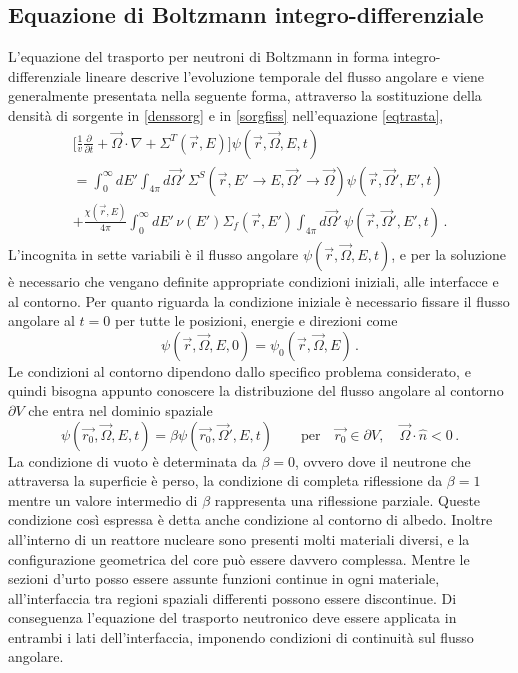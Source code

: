 \subsection{Equazione di Boltzmann integro-differenziale}
L'equazione del trasporto per neutroni di Boltzmann in forma 
integro-differenziale lineare descrive l'evoluzione temporale del flusso 
angolare e viene generalmente presentata nella seguente forma, attraverso la 
sostituzione della densità di sorgente in \eqref{denssorg} e in \eqref{sorgfiss} 
nell'equazione \eqref{eqtrasta},
\begin{multline}
\biggl[ \frac{1}{v} \frac{\partial}{\partial{t}} + \vec{\Omega} \cdot \nabla + 
\Sigma^T(\vec{r},E)
\biggr] \psi(\vec{r},\vec{\Omega},E,t) \\
= \int_{0}^{\infty} dE' \int_{4\pi} 
d\vec{\Omega}'\,\Sigma^S(\vec{r},{E'\rightarrow E},
{\vec{\Omega}'\rightarrow\vec{\Omega}}) 
\psi(\vec{r},\vec{\Omega}',E',t) \\
+ \frac{\chi(\vec{r},E)}{4\pi} \int_{0}^{\infty} dE'\,
\nu(E')\Sigma_f(\vec{r},E') \int_{4\pi} d\vec{\Omega}'\,
\psi(\vec{r},\vec{\Omega}',E',t) \,.
\end{multline}
L'incognita in sette variabili è il flusso angolare 
$\psi(\vec{r},\vec{\Omega},E,t)$, e per la soluzione è necessario che vengano 
definite appropriate condizioni iniziali, alle interfacce e al contorno. 
Per quanto riguarda la condizione iniziale è necessario fissare il flusso 
angolare al $t=0$ per tutte le posizioni, energie e direzioni come
\begin{equation}
\psi(\vec{r},\vec{\Omega},E,0)=\psi_0(\vec{r},\vec{\Omega},E) \,.
\end{equation} 
Le condizioni al contorno dipendono dallo specifico problema considerato, e 
quindi bisogna appunto conoscere la distribuzione del flusso angolare al 
contorno $\partial V$ che entra nel dominio spaziale
\begin{equation}
\psi(\vec{r_0},\vec{\Omega},E,t)=\beta \psi(\vec{r_0},\vec{\Omega}',E,t) \qquad 
\text{per} \quad \vec{r_0}\in \partial V,\quad\vec{\Omega}\cdot\hat{n}<0 \,.
\end{equation}
La condizione di vuoto è determinata da $\beta = 0$, ovvero dove il neutrone che 
attraversa la superficie è perso, la condizione di completa riflessione da 
$\beta=1$ mentre un valore intermedio di $\beta$ rappresenta una riflessione 
parziale. Queste condizione così espressa è detta anche condizione al contorno 
di albedo. Inoltre all'interno di un reattore nucleare sono presenti molti 
materiali diversi, e la configurazione geometrica del core può essere davvero 
complessa. Mentre le sezioni d'urto posso essere assunte funzioni continue in 
ogni materiale, all'interfaccia tra regioni spaziali differenti possono essere 
discontinue. Di conseguenza l'equazione del trasporto neutronico deve essere 
applicata in entrambi i lati dell'interfaccia, imponendo condizioni di 
continuità sul flusso angolare.

